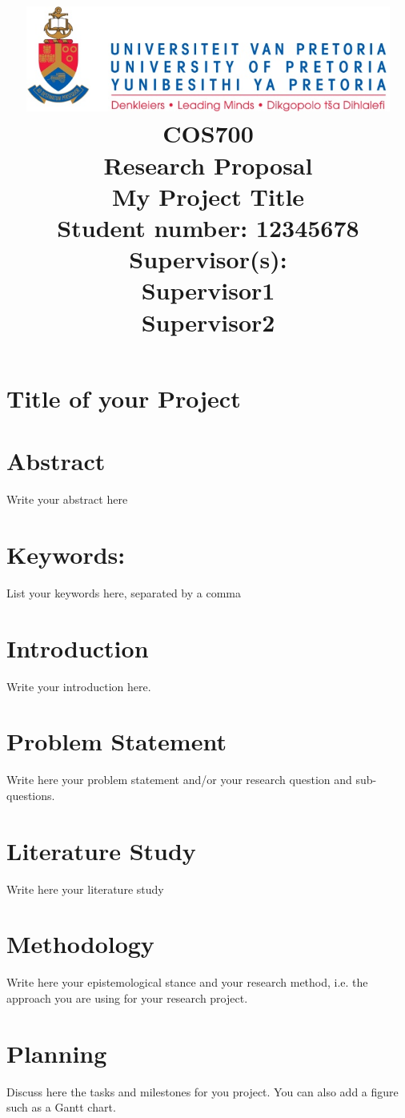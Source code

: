 \documentclass[a4paper,10pt]{article}
\title
{
   \includegraphics[width=12cm]{up_logo.png} \\
   \vspace{2cm}
   \textbf{COS700} \\
   \textbf{Research Proposal} \\ \vspace{0.5cm}
   \textbf{My Project Title} \\ \vspace{0.5cm}
   \textbf{Student number:} 12345678 \\ \vspace{0.5cm}
   \textbf{Supervisor(s)}: \\ Supervisor1 \\ Supervisor2 
}
\date{}
\begin{document}
\maketitle

\newpage
\linespread{1.25}
\section*{Title of your Project}

\section*{Abstract}
Write your abstract here

\section*{Keywords:}
List your keywords here, separated by a comma

\newpage

\section{Introduction}
Write your introduction here.

\section{Problem Statement}
Write here your problem statement and/or your research question and sub-questions.

\section{Literature Study}
Write here your literature study

\section{Methodology}
Write here your epistemological stance and your research method, i.e. the approach you are using for your research project.

\section{Planning}
Discuss here the tasks and milestones for you project. You can also add a figure such as a Gantt chart.


\end{document}
